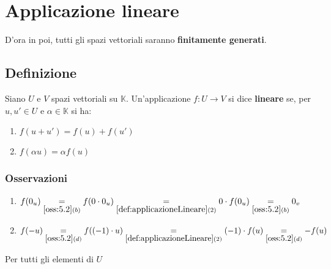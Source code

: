\documentclass[a4paper]{article}
\theoremstyle{break}
\theoremstyle{break}
\theoremstyle{break}
\theoremstyle{break}
\begin{document}
\section{Applicazione lineare}
D'ora in poi, tutti gli spazi vettoriali saranno \textbf{finitamente generati}.

\subsection{Definizione} \label{def:applicazioneLineare}
Siano \( U \) e \( V \) spazi vettoriali su \( \mathbb{K} \). Un'applicazione
\( f: U \to V \) si dice \textbf{lineare} se, per \( u, u' \in U \) e \( \alpha \in \mathbb{K} \)
si ha:
\begin{enumerate}
  \item \( f(u+u') = f(u) + f(u') \) 
  \item \( f(\alpha u) = \alpha f(u) \) 
\end{enumerate}

\subsubsection{Osservazioni}
\begin{enumerate}
  \item \( f(0_u) \underset{\ref{oss:5.2}(b)}{=} f(0 \cdot 0_u) \underset{\ref{def:applicazioneLineare}(2)}{=}
    0 \cdot f(0_u) \underset{\ref{oss:5.2}(b)}{=} 0_v\) 

  \item \( f(-u) \underset{\ref{oss:5.2}(d)}{=} f((-1)\cdot u) \underset{\ref{def:applicazioneLineare}(2)}{=}
    (-1) \cdot f(u) \underset{\ref{oss:5.2}(d)}{=} -f(u)\) 
\end{enumerate}
Per tutti gli elementi di \( U \) 
\end{document}
